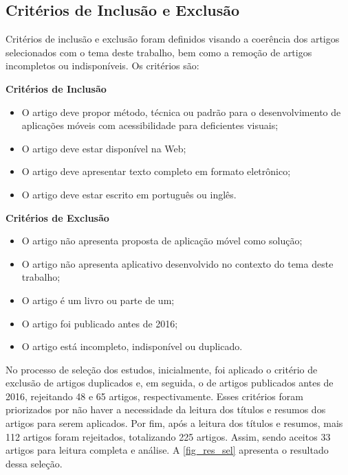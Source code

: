 \subsection{Critérios de Inclusão e Exclusão}

Critérios de inclusão e exclusão foram definidos visando a coerência dos artigos selecionados com o tema deste trabalho, bem como a remoção de artigos incompletos ou indisponíveis.
Os critérios são:

\textbf{Critérios de Inclusão}
\begin{itemize}
  \item O artigo deve propor método, técnica ou padrão para o desenvolvimento de aplicações móveis com acessibilidade para deficientes visuais;
  \item O artigo deve estar disponível na Web;
  \item O artigo deve apresentar texto completo em formato eletrônico;
  \item O artigo deve estar escrito em português ou inglês.
\end{itemize}

\textbf{Critérios de Exclusão}
\begin{itemize}
  \item O artigo não apresenta proposta de aplicação móvel como solução;
  \item O artigo não apresenta aplicativo desenvolvido no contexto do tema deste trabalho;
  \item O artigo é um livro ou parte de um;
  \item O artigo foi publicado antes de 2016;
  \item O artigo está incompleto, indisponível ou duplicado.
\end{itemize}

No processo de seleção dos estudos, inicialmente, foi aplicado o critério de exclusão de artigos duplicados e, em seguida, o de artigos publicados antes de 2016, rejeitando 48 e 65 artigos, respectivamente.
Esses critérios foram priorizados por não haver a necessidade da leitura dos títulos e resumos dos artigos para serem aplicados.
Por fim, após a leitura dos títulos e resumos, mais 112 artigos foram rejeitados, totalizando 225 artigos.
Assim, sendo aceitos 33 artigos para leitura completa e análise.
A \autoref{fig_res_sel} apresenta o resultado dessa seleção.

